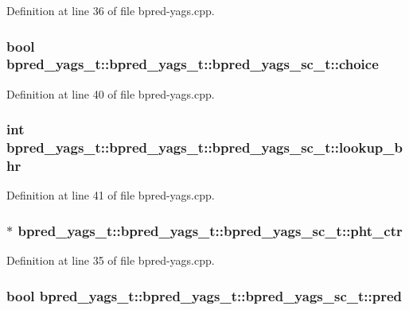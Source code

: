 Definition at line 36 of file bpred-yags.cpp.
\subsubsection[{choice}]{\setlength{\rightskip}{0pt plus 5cm}bool bpred\_\-yags\_\-t::bpred\_\-yags\_\-t::bpred\_\-yags\_\-sc\_\-t::choice}\label{classbpred__yags__t_1_1bpred__yags__sc__t_fc6f7eeb4c40e4238fb520de397720ba}




Definition at line 40 of file bpred-yags.cpp.
\subsubsection[{lookup\_\-bhr}]{\setlength{\rightskip}{0pt plus 5cm}int bpred\_\-yags\_\-t::bpred\_\-yags\_\-t::bpred\_\-yags\_\-sc\_\-t::lookup\_\-bhr}\label{classbpred__yags__t_1_1bpred__yags__sc__t_e38bab5acdb694cab0c8ba65ac6f53d9}




Definition at line 41 of file bpred-yags.cpp.
\subsubsection[{pht\_\-ctr}]{$\ast$ bpred\_\-yags\_\-t::bpred\_\-yags\_\-t::bpred\_\-yags\_\-sc\_\-t::pht\_\-ctr}\label{classbpred__yags__t_1_1bpred__yags__sc__t_728118af919daecc1cf605383894ec34}




Definition at line 35 of file bpred-yags.cpp.
\subsubsection[{pred}]{\setlength{\rightskip}{0pt plus 5cm}bool bpred\_\-yags\_\-t::bpred\_\-yags\_\-t::bpred\_\-yags\_\-sc\_\-t::pred}\label{classbpred__yags__t_1_1bpred__yags__sc__t_7dd4da95802c6cd1e2992107433dc7ef}




